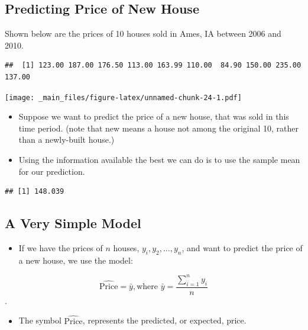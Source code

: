 \documentclass[]{book}
\newenvironment{Shaded}{\begin{snugshade}}{\end{snugshade}}
\newcommand{\KeywordTok}[1]{\textcolor[rgb]{0.13,0.29,0.53}{\textbf{#1}}}
\newcommand{\OperatorTok}[1]{\textcolor[rgb]{0.81,0.36,0.00}{\textbf{#1}}}
\newcommand{\NormalTok}[1]{#1}
\providecommand{\tightlist}{%
  \setlength{\itemsep}{0pt}\setlength{\parskip}{0pt}}
\begin{document}
\subsection{Predicting Price of New
House}\label{predicting-price-of-new-house}

Shown below are the prices of 10 houses sold in Ames, IA between 2006
and 2010.

\begin{verbatim}
##  [1] 123.00 187.00 176.50 113.00 163.99 110.00  84.90 150.00 235.00 137.00
\end{verbatim}

\texttt{[image: \_main\_files/figure-latex/unnamed-chunk-24-1.pdf]}

\begin{itemize}
\item
  Suppose we want to predict the price of a new house, that was sold in
  this time period. (note that new means a house not among the original
  10, rather than a newly-built house.)
\item
  Using the information available the best we can do is to use the
  sample mean for our prediction.
\end{itemize}

\begin{Shaded}
\end{Shaded}

\begin{verbatim}
## [1] 148.039
\end{verbatim}

\subsection{A Very Simple Model}\label{a-very-simple-model}

\begin{itemize}
\tightlist
\item
  If we have the prices of \(n\) houses, \(y_i, y_2, \ldots, y_n\), and
  want to predict the price of a new house, we use the model:
\end{itemize}

\[
\widehat{\text{Price}} = \bar{y},  \text{where } \bar{y}=\frac{\displaystyle\sum_{i=1}^ny_i}{n}\].

\begin{itemize}
\tightlist
\item
  The symbol \(\widehat{\text{Price}}\), represents the predicted, or
  expected, price.
\end{itemize}
\end{document}
